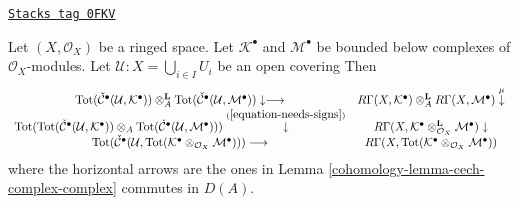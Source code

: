 \begin{lemma}
\label{cohomology-lemma-diagrams-commute}
\href{https://stacks.math.columbia.edu/tag/0FKV}{\texttt{Stacks tag 0FKV}}

Let $(X, \mathcal{O}_X)$ be a ringed space. Let
$\mathcal{K}^\bullet$ and $\mathcal{M}^\bullet$
be bounded below complexes of $\mathcal{O}_X$-modules.
Let $\mathcal{U} : X = \bigcup_{i \in I} U_i$ be an open covering
Then
$$
\begin{array}{cc}\text{Tot}(\check{\mathcal{C}}^\bullet(\mathcal{U}, \mathcal{K}^\bullet))
\otimes_A^\mathbf{L}
\text{Tot}(\check{\mathcal{C}}^\bullet(\mathcal{U}, \mathcal{M}^\bullet))
\downarrow\longrightarrow & R\Gamma(X, \mathcal{K}^\bullet)
\otimes_A^\mathbf{L}
R\Gamma(X, \mathcal{M}^\bullet) \overset{\mu}{\downarrow} \\ \text{Tot}(
\text{Tot}(\check{\mathcal{C}}^\bullet(\mathcal{U}, \mathcal{K}^\bullet))
\otimes_A
\text{Tot}(\check{\mathcal{C}}^\bullet(\mathcal{U}, \mathcal{M}^\bullet)))
\overset{(\ref{equation-needs-signs})}{\downarrow} & R\Gamma(X,
\mathcal{K}^\bullet \otimes_{\mathcal{O}_X}^\mathbf{L} \mathcal{M}^\bullet)
\downarrow \\ \text{Tot}(
\check{\mathcal{C}}^\bullet({\mathcal U},
\text{Tot}(\mathcal{K}^\bullet \otimes_{\mathcal{O}_X} \mathcal{M}^\bullet)
)) \longrightarrow & R\Gamma(X,
\text{Tot}(\mathcal{K}^\bullet \otimes_{\mathcal{O}_X} \mathcal{M}^\bullet))\end{array}
$$
where the horizontal arrows are the ones in
Lemma \ref{cohomology-lemma-cech-complex-complex}
commutes in $D(A)$.
\end{lemma}


